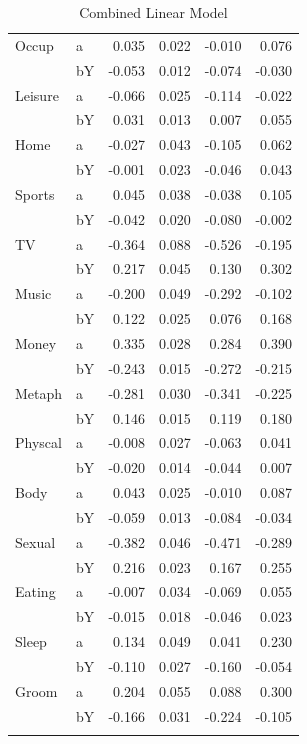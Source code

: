 \documentclass[11pt,a4paper]{article}
\begin{document}
\begin{longtable}{llrrrr}
Occup & a &  0.035 &  0.022 &   -0.010 &     0.076 \\
      & bY & -0.053 &  0.012 &   -0.074 &    -0.030 \\
Leisure & a & -0.066 &  0.025 &   -0.114 &    -0.022 \\
      & bY &  0.031 &  0.013 &    0.007 &     0.055 \\
Home & a & -0.027 &  0.043 &   -0.105 &     0.062 \\
      & bY & -0.001 &  0.023 &   -0.046 &     0.043 \\
Sports & a &  0.045 &  0.038 &   -0.038 &     0.105 \\
      & bY & -0.042 &  0.020 &   -0.080 &    -0.002 \\
TV & a & -0.364 &  0.088 &   -0.526 &    -0.195 \\
      & bY &  0.217 &  0.045 &    0.130 &     0.302 \\
Music & a & -0.200 &  0.049 &   -0.292 &    -0.102 \\
      & bY &  0.122 &  0.025 &    0.076 &     0.168 \\
Money & a &  0.335 &  0.028 &    0.284 &     0.390 \\
      & bY & -0.243 &  0.015 &   -0.272 &    -0.215 \\
Metaph & a & -0.281 &  0.030 &   -0.341 &    -0.225 \\
      & bY &  0.146 &  0.015 &    0.119 &     0.180 \\
Physcal & a & -0.008 &  0.027 &   -0.063 &     0.041 \\
      & bY & -0.020 &  0.014 &   -0.044 &     0.007 \\
Body & a &  0.043 &  0.025 &   -0.010 &     0.087 \\
      & bY & -0.059 &  0.013 &   -0.084 &    -0.034 \\
Sexual & a & -0.382 &  0.046 &   -0.471 &    -0.289 \\
      & bY &  0.216 &  0.023 &    0.167 &     0.255 \\
Eating & a & -0.007 &  0.034 &   -0.069 &     0.055 \\
      & bY & -0.015 &  0.018 &   -0.046 &     0.023 \\
Sleep & a &  0.134 &  0.049 &    0.041 &     0.230 \\
      & bY & -0.110 &  0.027 &   -0.160 &    -0.054 \\
Groom & a &  0.204 &  0.055 &    0.088 &     0.300 \\
      & bY & -0.166 &  0.031 &   -0.224 &    -0.105 \\
\bottomrule
\caption{Combined Linear Model}
\end{longtable}
\clearpage
\twocolumn
\end{document}
